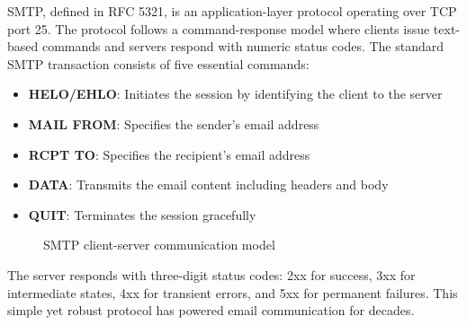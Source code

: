 \documentclass[12pt]{article}
\begin{document}
	SMTP, defined in RFC 5321, is an application-layer protocol operating over TCP port 25. The protocol follows a command-response model where clients issue text-based commands and servers respond with numeric status codes. The standard SMTP transaction consists of five essential commands:
	
	\begin{itemize}
		\item \textbf{HELO/EHLO}: Initiates the session by identifying the client to the server
		\item \textbf{MAIL FROM}: Specifies the sender's email address
		\item \textbf{RCPT TO}: Specifies the recipient's email address
		\item \textbf{DATA}: Transmits the email content including headers and body
		\item \textbf{QUIT}: Terminates the session gracefully
	\end{itemize}
	
	\begin{figure}[H]
		\centering
		\caption{SMTP client-server communication model}
		\label{fig:smtp-model}
	\end{figure}
	
	The server responds with three-digit status codes: 2xx for success, 3xx for intermediate states, 4xx for transient errors, and 5xx for permanent failures. This simple yet robust protocol has powered email communication for decades.
	
\end{document}
